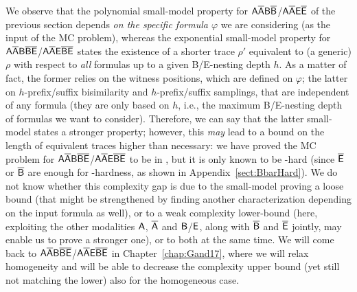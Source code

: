 We observe that the polynomial small-model property for $\mathsf{A\overline{A}B\overline{B}}$/$\mathsf{A\overline{A}E\overline{E}}$ of the previous section depends \emph{on the specific formula $\varphi$} we are considering (as the input of the MC problem), whereas the exponential small-model property for $\mathsf{A\overline{A}B\overline{B}\overline{E}}$/$\mathsf{A\overline{A}E\overline{B}\overline{E}}$ states the existence of a shorter trace $\rho'$ equivalent to (a generic) $\rho$ with respect to \emph{all} formulas up to a given B/E-nesting depth $h$. As a matter of fact, the former relies on the witness positions, which are defined on $\varphi$; the latter on $h$-prefix/suffix bisimilarity and $h$-prefix/suffix samplings, that are independent of any formula (they are only based on $h$, i.e., the maximum B/E-nesting depth of formulas we want to consider).
%
Therefore, we can say that the latter small-model states a stronger property; however, this \emph{may} lead to a bound on the length of equivalent traces higher than necessary: 
%
we have proved the MC problem for $\mathsf{A\overline{A}B\overline{B}\overline{E}}$/$\mathsf{A\overline{A}E\overline{B}\overline{E}}$ to be in \EXPSPACE, but it is only known to be \PSPACE-hard (since $\mathsf{\overline{E}}$ or $\mathsf{\overline{B}}$ are enough for \PSPACE-hardness, as shown in Appendix~\ref{sect:BbarHard}). We do not know whether this  complexity gap is due to the small-model proving a loose bound (that might be strengthened by finding another characterization depending on the input formula as well), or to a weak complexity lower-bound (here, exploiting the other modalities $\mathsf{A}$, $\mathsf{\overline{A}}$ and $\mathsf{B}$/$\mathsf{E}$, along with $\mathsf{\overline{B}}$ and $\mathsf{\overline{E}}$ jointly, may enable us to prove a stronger one), or to both at the same time. We will come back to $\mathsf{A\overline{A}B\overline{B}\overline{E}}$/$\mathsf{A\overline{A}E\overline{B}\overline{E}}$ in Chapter~\ref{chap:Gand17}, where we will relax homogeneity and will be able to decrease the complexity upper bound (yet still not matching the lower) also for the  homogeneous case.